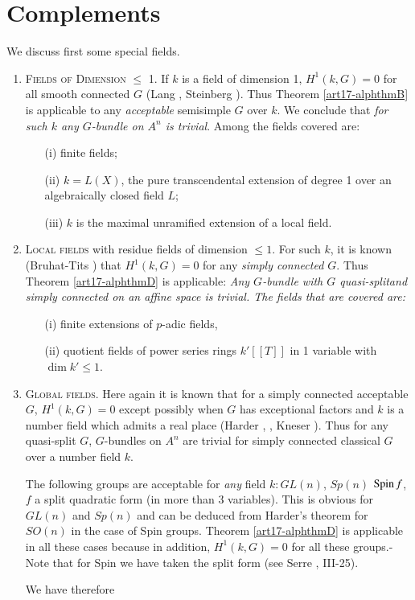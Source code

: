 \section{Complements}\label{art17-sec4}
We discuss first some special fields.
\begin{enumerate}
\item \textsc{Fields of Dimension $\leqslant$ 1.} If $k$ is a field of dimension 1, $H^1 (k,G) = 0$ for all smooth connected $G$ (Lang \cite{art17-key7}, Steinberg \cite{art17-key14}). Thus Theorem \ref{art17-alphthmB} is applicable to any {\em acceptable } semisimple $G$ over $k$. We conclude that {\em for such $k$ any $G$-bundle on $A^n$ is trivial}. Among the fields covered are:
\begin{itemize}
\item[(i)] finite fields;

\item[(ii)] $k = L (X)$, the pure transcendental extension of degree 1 over an algebraically closed field $L$;

\item[(iii)] $k$ is the maximal unramified extension of a local field.
\end{itemize}

\item \textsc{Local fields} with residue fields of dimension $\leqslant 1$. For such $k$, it is known (Bruhat-Tits \cite{art17-key2}) that $H^1 (k,G) = 0$ for any {\em simply connected $G$}. Thus Theorem \ref{art17-alphthmD} is applicable: {\em Any $G$-bundle with $G$ quasi-split\pageoriginale and simply connected on an affine space is trivial. The fields that are covered are:}
\begin{itemize}
\item[(i)] finite extensions of $p$-adic fields,

\item[(ii)] quotient fields of power series rings $k'[[T]]$ in 1 variable with $\dim k' \leqslant 1$.
\end{itemize}

\item \textsc{Global fields.} Here again it is known that for a simply connected acceptable $G$, $H^1 (k,G) = 0$ except possibly when $G$ has exceptional factors and $k$ is a number field which admits a real place (Harder \cite{art17-key5a}, \cite{art17-key5b}, Kneser \cite{art17-key6b}). Thus for any quasi-split $G$, $G$-bundles on $A^n$ are trivial for simply connected classical $G$ over a number field $k$.

The following groups are acceptable for {\it any} field $k: GL(n)$, $Sp(n)$ $\operatorname{Spin} f$, $f$ a split quadratic form (in more than 3 variables). This is obvious for $GL(n)$ and $Sp(n)$ and can be deduced from Harder's theorem for $SO(n)$ in the case of Spin groups. Theorem \ref{art17-alphthmD} is applicable in all these cases because in addition, $H^1(k,G)=0$ for all these groups.-Note that for Spin we have taken the split form (see Serre \cite{art17-key12}, III-25).

We have therefore
\end{enumerate}

